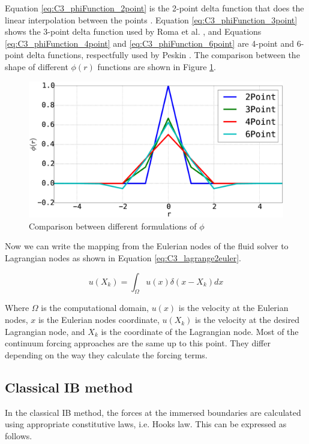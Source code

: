 Equation \eqref{eq:C3_phiFunction_2point} is the 2-point delta function that does the linear interpolation between the points \cite{saiki1996numerical}. Equation \eqref{eq:C3_phiFunction_3point} shows the 3-point delta function used by Roma et al. \cite{roma1999adaptive}, and Equations \eqref{eq:C3_phiFunction_4point} and \eqref{eq:C3_phiFunction_6point} are 4-point and 6-point delta functions, respectfully used by Peskin \cite{peskin2002immersed}. The comparison between the shape of different $\phi(r)$ functions are shown in Figure \ref{fig:C3_phi_function}.

\begin{figure}[H]
    \centering
    \includegraphics[width=14.cm]{Chapter_3/figure/phi_function.eps}
    \caption{Comparison between different formulations of $\phi$}
    \label{fig:C3_phi_function}
\end{figure}

Now we can write the mapping from the Eulerian nodes of the fluid solver to Lagrangian nodes as shown in Equation \eqref{eq:C3_lagrange2euler}.

\begin{equation}\label{eq:C3_lagrange2euler}
    u(X_k) = \int_\Omega u(x) \delta(x - X_k) dx
\end{equation}

Where $\Omega$ is the computational domain, $u(x)$ is the velocity at the Eulerian nodes, $x$ is the Eulerian nodes coordinate, $u(X_k)$ is the velocity at the desired Lagrangian node, and $X_k$ is the coordinate of the Lagrangian node. Most of the continuum forcing approaches are the same up to this point. They differ depending on the way they calculate the forcing terms.

\subsection{Classical IB method}
In the classical IB method, the forces at the immersed boundaries are calculated using appropriate constitutive laws, i.e. Hooks law. This can be expressed as follows.


